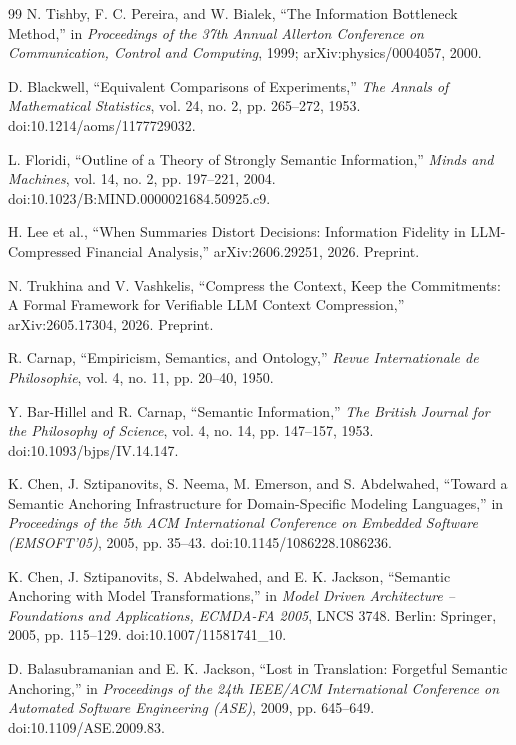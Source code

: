 \documentclass[11pt,a4paper]{article}
\begin{document}
\begin{thebibliography}{99}
N. Tishby, F. C. Pereira, and W. Bialek, ``The Information Bottleneck Method,'' in \emph{Proceedings of the 37th Annual Allerton Conference on Communication, Control and Computing}, 1999; arXiv:physics/0004057, 2000.

D. Blackwell, ``Equivalent Comparisons of Experiments,'' \emph{The Annals of Mathematical Statistics}, vol. 24, no. 2, pp. 265--272, 1953. doi:10.1214/aoms/1177729032.

L. Floridi, ``Outline of a Theory of Strongly Semantic Information,'' \emph{Minds and Machines}, vol. 14, no. 2, pp. 197--221, 2004. doi:10.1023/B:MIND.0000021684.50925.c9.

H. Lee et al., ``When Summaries Distort Decisions: Information Fidelity in LLM-Compressed Financial Analysis,'' arXiv:2606.29251, 2026. Preprint.

N. Trukhina and V. Vashkelis, ``Compress the Context, Keep the Commitments: A Formal Framework for Verifiable LLM Context Compression,'' arXiv:2605.17304, 2026. Preprint.

R. Carnap, ``Empiricism, Semantics, and Ontology,'' \emph{Revue Internationale de Philosophie}, vol. 4, no. 11, pp. 20--40, 1950.

Y. Bar-Hillel and R. Carnap, ``Semantic Information,'' \emph{The British Journal for the Philosophy of Science}, vol. 4, no. 14, pp. 147--157, 1953. doi:10.1093/bjps/IV.14.147.

K. Chen, J. Sztipanovits, S. Neema, M. Emerson, and S. Abdelwahed, ``Toward a Semantic Anchoring Infrastructure for Domain-Specific Modeling Languages,'' in \emph{Proceedings of the 5th ACM International Conference on Embedded Software (EMSOFT'05)}, 2005, pp. 35--43. doi:10.1145/1086228.1086236.

K. Chen, J. Sztipanovits, S. Abdelwahed, and E. K. Jackson, ``Semantic Anchoring with Model Transformations,'' in \emph{Model Driven Architecture -- Foundations and Applications, ECMDA-FA 2005}, LNCS 3748. Berlin: Springer, 2005, pp. 115--129. doi:10.1007/11581741\_10.

D. Balasubramanian and E. K. Jackson, ``Lost in Translation: Forgetful Semantic Anchoring,'' in \emph{Proceedings of the 24th IEEE/ACM International Conference on Automated Software Engineering (ASE)}, 2009, pp. 645--649. doi:10.1109/ASE.2009.83.


\end{thebibliography}
\end{document}
